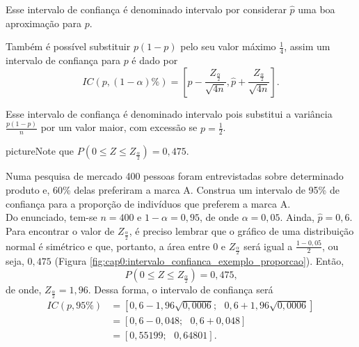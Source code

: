 \documentclass[11pt,fleqn]{book}
\numberwithin{mpicture}{chapter}
\numberwithin{mtable}{chapter}
\numberwithin{mframe}{chapter}
\begin{document}
Esse intervalo de confiança é denominado intervalo  por considerar $\hat{p}$ uma boa aproximação para $p$.

Também é possível substituir $p(1-p)$ pelo seu valor máximo $\frac{1}{4}$, assim um intervalo de confiança para $p$ é dado por
\[
	IC(p,  (1-\alpha)\%) = \left [
		\hat{p} - \frac{Z_{\frac{\alpha}{2}}}{\sqrt{4n} }
		,
		\hat{p} + \frac{Z_{\frac{\alpha}{2}}}{\sqrt{4n} }
	\right ]
	\text{.}
\]

Esse intervalo de confiança é denominado intervalo  pois substitui a variância $\frac{p(1-p)}{n}$ por um valor maior, com excessão se $p=\frac{1}{2}$.

\begin{sidepicture}{6cm}{picture}{Note que $P(0\leqslant Z\leqslant Z_{\frac{\alpha}{2}})=0,475$.}
	\label{fig:cap0:intervalo_confianca_exemplo_proporcao}
\end{sidepicture}

\begin{example}
	\label{example:exemplo_proporcao}
	Numa pesquisa de mercado 400 pessoas foram entrevistadas sobre determinado produto e, 60\% delas preferiram a marca A. Construa um intervalo de 95\% de confiança para a proporção de indivíduos que preferem a marca A.\\
	
	Do enunciado, tem-se $n=400$ e $1-\alpha=0,95$, de onde $\alpha=0,05$. Ainda, $\hat{p}=0,6$. Para encontrar o valor de $Z_{\frac{\alpha}{2}}$, é preciso lembrar que o gráfico de uma distribuição normal é simétrico e que, portanto, a área entre 0 e $Z_{\frac{\alpha}{2}}$ será igual a $\frac{1-0,05}{2}$, ou seja, $0,475$ (Figura \ref{fig:cap0:intervalo_confianca_exemplo_proporcao}). Então, 
	\[
		P(0\leqslant Z\leqslant Z_{\frac{\alpha}{2}})=0,475\text{,}
	\]
	de onde, $Z_{\frac{\alpha}{2}}=1,96$. Dessa forma, o intervalo de confiança será
	\begin{align*}
		IC(p, 95\%)&= [0,6-1,96\sqrt{0,0006};\text{ }0,6+1,96\sqrt{0,0006}]\\
				   &= [0,6-0,048;\text{ }0,6+0,048]\\
				   &= [0,55199;\text{ }0,64801]\text{.}
	\end{align*}
\end{example}
\end{document}
